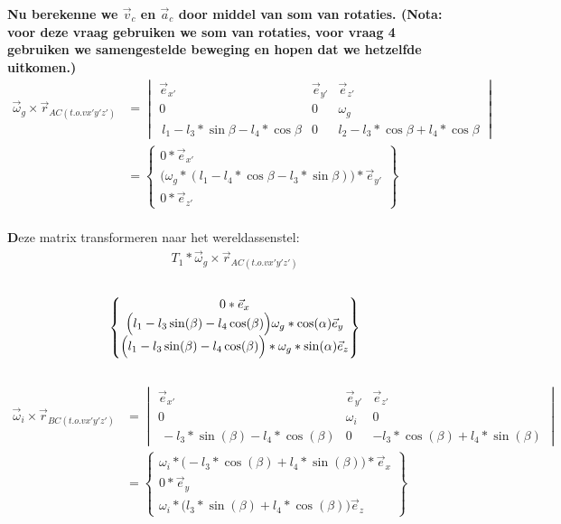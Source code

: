 \documentclass[a4paper,10pt]{article}
\begin{document}
\textbf{Nu berekenne we $\vec{v}_c$ en $\vec{a}_c$ door middel van som van rotaties. (Nota: voor deze vraag gebruiken we som van rotaties, voor vraag 4 gebruiken we samengestelde beweging en hopen dat we hetzelfde uitkomen.)}
\begin{equation}
	\begin{aligned}
		\vec{\omega}_g \times \vec{r}_{AC(t.o.v x'y'z')} & = \begin{vmatrix}
			\vec{e}_{x'}& \vec{e}_{y'} & \vec{e}_{z'}\\
			0 & 0 & \omega_g \\
			\ l_1 - l_3 * \sin{\beta} - l_4*\cos{\beta} & 0 & l_2 - l_3 * \cos{\beta} + l_4 * \cos{\beta}\end{vmatrix}\\
		&= \begin{Bmatrix}
			0 *\vec{e}_{x'}\\
			\Big(\omega_g*(l_1-l_4*\cos{\beta} - l_3 * \sin{\beta})\Big)*\vec{e}_{y'}\\
			0 * \vec{e}_{z'}
		\end{Bmatrix}
	\end{aligned}
\end{equation}\\
\textbf Deze matrix transformeren naar het wereldassenstel:\
\begin{equation}
	\begin{aligned}
		{T}_{1}* \vec{\omega}_g \times \vec{r}_{AC(t.o.v x'y'z')}
	\end{aligned}
\end{equation}\\
\begin{equation}
	\begin{Bmatrix}
		{0*\vec{e}_{x}}\\
		\Big(l_1-l_3\sin(\beta)-l_4\cos(\beta)\Big)\omega_g*\cos(\alpha) \vec{e}_{y}\\
		\Big{(l_1-l_3\sin(\beta)-l_4\cos(\beta)\Big)*\omega_g*\sin(\alpha)\vec{e}_{z}}
	\end{Bmatrix}
\end{equation}\\
\begin{equation}
	\begin{aligned}
		\vec{\omega}_i \times \vec{r}_{BC(t.o.v x'y'z')} & = \begin{vmatrix}
			\vec{e}_{x'}& \vec{e}_{y'} & \vec{e}_{z'}\\
			0 & \omega_i & 0 \\
			\  -l_3 * \sin(\beta) - l_4 * \cos(\beta) & 0 &  -l_3*\cos(\beta) + l_4 *\sin(\beta)
		\end{vmatrix}\\
		&= \begin{Bmatrix}
			\omega_i*\Big(-l_3*\cos(\beta) + l_4 *\sin(\beta)\Big) *\vec{e}_{x}\\
			0*\vec{e}_{y}\\
			\omega_i*\Big(l_3 * \sin(\beta) + l_4 * \cos(\beta)\Big) \vec{e}_{z}
		\end{Bmatrix}
	\end{aligned}
\end{equation}\\
\end{document}
